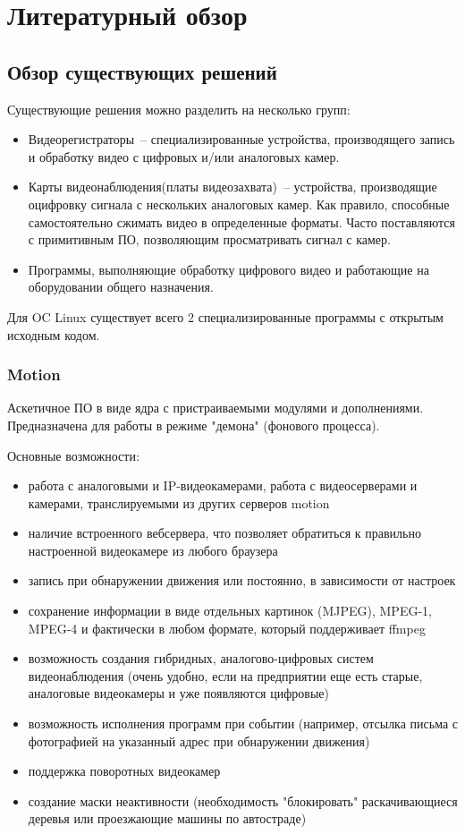 \chapter{Литературный обзор}
\section{Обзор существующих решений}

Существующие решения можно разделить на несколько групп:
\smallskip
\begin{itemize}
	\item
	Видеорегистраторы~-- специализированные устройства,
	производящего запись и обработку видео с цифровых и/или аналоговых камер.
	\item
	Карты видеонаблюдения(платы видеозахвата)~-- устройства, производящие оцифровку
	сигнала с нескольких аналоговых камер. Как правило, способные самостоятельно сжимать
	видео в определенные форматы. Часто поставляются с примитивным ПО, позволяющим
	просматривать сигнал с камер.
	\item
	Программы, выполняющие обработку цифрового видео и работающие на оборудовании общего
	назначения.
\end{itemize}

\medskip

Для OC Linux существует всего 2 специализированные программы с открытым исходным кодом.

\subsection{Motion}

Аскетичное ПО в виде ядра с пристраиваемыми модулями и дополнениями.
Предназначена для работы в режиме "демона" (фонового процесса).

\medskip

Основные возможности:
\smallskip
\begin{itemize}
	\item
	работа с аналоговыми и IP-видеокамерами, работа с видеосерверами и камерами,
	транслируемыми из других серверов motion
	\item
	наличие встроенного вебсервера, что позволяет обратиться к правильно
	настроенной видеокамере из любого браузера
	\item
	запись при обнаружении движения или постоянно, в зависимости от настроек
	\item
	сохранение информации в виде отдельных картинок (MJPEG), MPEG-1, MPEG-4 и
	фактически в любом формате, который поддерживает ffmpeg
	\item
	возможность создания гибридных, аналогово-цифровых систем видеонаблюдения
	(очень удобно, если на предприятии еще есть старые, аналоговые видеокамеры
	и уже появляются цифровые)
	\item
	возможность исполнения программ при событии
	(например, отсылка письма с фотографией на указанный адрес при обнаружении движения)
	\item
	поддержка поворотных видеокамер
	\item
	создание маски неактивности (необходимость "блокировать" раскачивающиеся
	деревья или проезжающие машины по автостраде)
\end{itemize}

